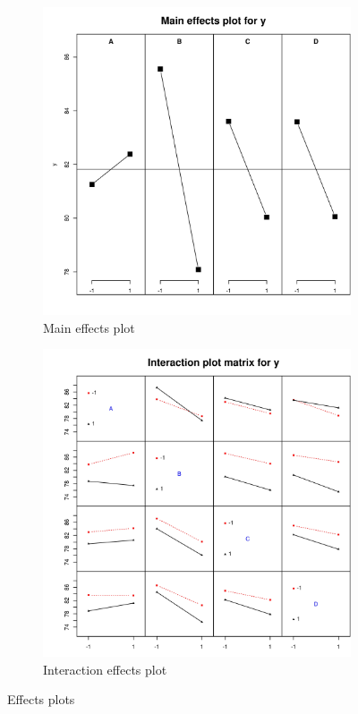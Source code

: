 \documentclass{article}
\begin{document}
\begin{figure}[!ht]
    \begin{subfigure}{0.49\textwidth}
        \centering
        \includegraphics[width=\textwidth]{main_effects_plot.jpeg}
        \caption{Main effects plot}
        \label{fig:main_effects_plot}
    \end{subfigure}
    \begin{subfigure}{0.49\textwidth}
        \centering
        \includegraphics[width=\textwidth]{interaction_effects_plot.jpeg}
        \caption{Interaction effects plot}
        \label{fig:interaction_effects_plot}
    \end{subfigure}
    \caption{Effects plots}
    \label{fig:effects_plots}
\end{figure}
\end{document}
